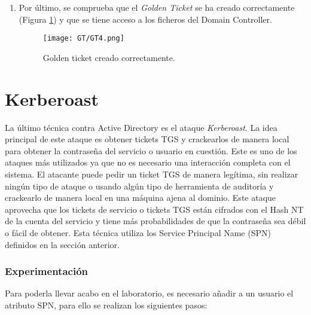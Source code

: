 \begin{enumerate}
\item Por último, se comprueba que el {\it Golden Ticket} se ha creado correctamente (Figura \ref{GT4}) y que se tiene acceso a los ficheros del Domain Controller.
\begin{figure}[H] %
\begin{center}
\texttt{[image: GT/GT4.png]}
\end{center}
\caption{Golden ticket creado correctamente.}
\label{GT4}
\end{figure}

\end{enumerate}

\section{Kerberoast}

La último técnica contra Active Directory es el ataque {\it Kerberoast}. La idea principal de este ataque es obtener tickets TGS y crackearlos de manera local para obtener la contraseña del servicio o usuario en cuestión. Este es uno de los ataques más utilizados ya que no es necesario una interacción completa con el sistema. El atacante puede pedir un ticket TGS de manera legítima, sin realizar ningún tipo de ataque o usando algún tipo de herramienta de auditoría y crackearlo de manera local en una máquina ajena al dominio. Este ataque aprovecha que los tickets de servicio o tickets TGS están cifrados con el Hash NT de la cuenta del servicio y tiene más probabilidades de que la contraseña sea débil o fácil de obtener. Esta técnica utiliza los Service Principal Name (SPN)~\cite{Capitulo4:SPN} definidos en la sección anterior. 

\subsubsection{Experimentación}

Para poderla llevar acabo en el laboratorio, es necesario añadir a un usuario el atributo SPN, para ello se realizan los siguientes pasos:

